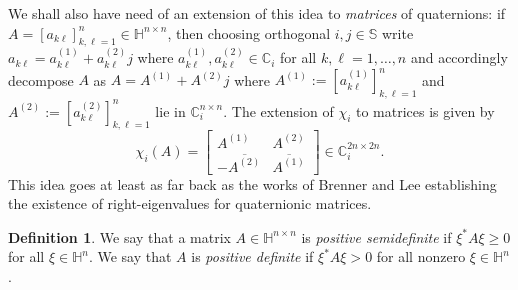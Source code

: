 \documentclass[11pt,reqno]{amsart}
\def\x{\chi}
\def\CC{\mathbb{C}}
\def\SS{\mathbb{S}}
\def\HH{\mathbb{H}}
\theoremstyle{definition}
\newtheorem{definition}[theorem]{Definition}
\numberwithin{equation}{section}
\begin{document}
We shall also have need of an extension of this idea to \emph{matrices} of quaternions: if \(A = [a_{k\ell}]_{k,\ell = 1}^{n} \in \HH^{n\times n}\), then choosing orthogonal \(i,j \in \SS\) write \(a_{k\ell} = a^{(1)}_{k\ell} + a^{(2)}_{k\ell}j\) where \(a^{(1)}_{k\ell}, a^{(2)}_{k\ell} \in \CC_i\) for all \(k, \ell = 1, \ldots, n\) and accordingly decompose \(A\) as \(A = A^{(1)} + A^{(2)}j\) where \(A^{(1)} := [a^{(1)}_{k\ell}]_{k,\ell = 1}^n\) and \(A^{(2)} := [a^{(2)}_{k\ell}]_{k,\ell=1}^n\) lie in \(\CC_i^{n\times n}\). The extension of \(\x_i\) to matrices is given by
\[
    \x_i(A) = \begin{bmatrix} A^{(1)} & A^{(2)} \\[6pt] -\overline{A^{(2)}} & \overline{A^{(1)}} \end{bmatrix} \in \CC_i^{2n \times 2n}.
\]
This idea goes at least as far back as the works of Brenner \cite{Bre51} and Lee \cite{Lee49} establishing the existence of right-eigenvalues for quaternionic matrices. 

\begin{definition}
    We say that a matrix \(A \in \HH^{n\times n}\) is \emph{positive semidefinite} if \(\xi^* A \xi \geq 0\) for all \(\xi \in \HH^n\). We say that \(A\) is \emph{positive definite} if \(\xi^* A \xi > 0\) for all nonzero \(\xi \in \HH^n\).
\end{definition}
\end{document}
